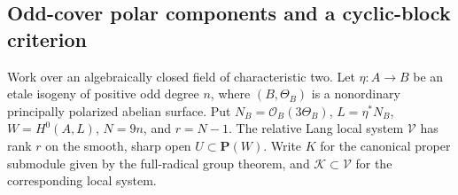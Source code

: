 \subsection{Odd-cover polar components and a cyclic-block criterion}

Work over an algebraically closed field of characteristic two. Let
\(\eta:A\to B\) be an etale isogeny of positive odd degree \(n\),
where \((B,\Theta_B)\) is a nonordinary principally polarized
abelian surface. Put \(N_B=\mathcal O_B(3\Theta_B)\),
\(L=\eta^*N_B\), \(W=H^0(A,L)\), \(N=9n\), and \(r=N-1\).
The relative Lang local system \(\mathcal V\) has rank \(r\)
on the smooth, sharp open \(U\subset\mathbf P(W)\).
Write \(K\) for the canonical proper submodule given by the
full-radical group theorem, and \(\mathcal K\subset\mathcal V\)
for the corresponding local system.

